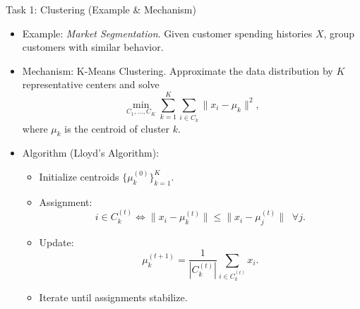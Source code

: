 \documentclass[aspectratio=169]{beamer}
\newcommand{\1}{\mathbf{1}}
\begin{document}
\begin{frame}{Task 1: Clustering (Example \& Mechanism)}
    \small
    \begin{itemize}
        \item Example:
        \textit{Market Segmentation}.  
        Given customer spending histories $X$, group customers with similar behavior.
        
        \item Mechanism: K-Means Clustering. Approximate the data distribution by $K$ representative centers and solve
        \[
            \min_{C_1,\dots,C_K}
            \sum_{k=1}^K \sum_{i \in C_k} \|x_i - \mu_k\|^2,
        \]
        where $\mu_k$ is the centroid of cluster $k$.
        
        \item Algorithm (Lloyd’s Algorithm):
        \begin{itemize}
            \item Initialize centroids $\{\mu_k^{(0)}\}_{k=1}^K$.
            
            \item Assignment:
            \[
                i \in C_k^{(t)}
                \iff
                \|x_i - \mu_k^{(t)}\|
                \le
                \|x_i - \mu_j^{(t)}\| \;\; \forall j.
            \]
            
            \item Update:
            \[
                \mu_k^{(t+1)}
                =
                \frac{1}{|C_k^{(t)}|}
                \sum_{i \in C_k^{(t)}} x_i.
            \]
            
            \item Iterate until assignments stabilize.
        \end{itemize}
    \end{itemize}
\end{frame}
\end{document}
